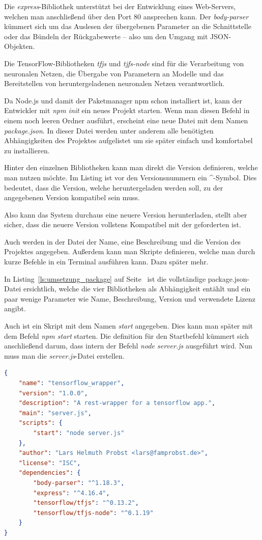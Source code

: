 Die \textit{express}-Bibliothek unterstützt bei der Entwicklung eines Web-Servers, welchen man anschließend über den
Port 80 ansprechen kann. Der \textit{body-parser} kümmert sich um das Auslesen der übergebenen Parameter an die
Schnittstelle oder das Bündeln der Rückgabewerte -- also um den Umgang mit JSON-Objekten.

Die TensorFlow-Bibliotheken \textit{tfjs} und \textit{tjfs-node} sind für die Verarbeitung von neuronalen Netzen,
die Übergabe von Parametern an Modelle und das Bereitstellen von heruntergeladenen neuronalen Netzen verantwortlich.

Da Node.js und damit der Paketmanager npm schon installiert ist, kann der Entwickler mit \textit{npm init} ein neues 
Projekt starten. Wenn man diesen Befehl in einem noch leeren Ordner ausführt, erscheint eine neue Datei mit dem Namen
\textit{package.json}. In dieser Datei werden unter anderem alle benötigten Abhängigkeiten des Projektes aufgelistet 
um sie später einfach und komfortabel zu installieren.

Hinter den einzelnen Bibliotheken kann man direkt die Version definieren, welche man nutzen möchte. Im Listing ist vor
den Versionsnummern ein \textbf{\^}-Symbol. Dies bedeutet, dass die Version, welche heruntergeladen werden soll, zu der
angegebenen Version kompatibel sein muss.

Also kann das System durchaus eine neuere Version herunterladen, stellt aber sicher, dass die neuere Version vollstens
Kompatibel mit der geforderten ist.

Auch werden in der Datei der Name, eine Beschreibung und die Version des Projektes angegeben. Außerdem kann man Skripte
definieren, welche man durch kurze Befehle in ein Terminal ausführen kann. Dazu später mehr.

In Listing~\ref{ls:umsetzung_package} auf Seite~\pageref{ls:umsetzung_package} ist die vollständige package.json-Datei
ersichtlich, welche die vier Bibliotheken als Abhängigkeit entählt und ein paar wenige Parameter wie Name, Beschreibung,
Version und verwendete Lizenz angibt. 

Auch ist ein Skript mit dem Namen \textit{start} angegeben. Dies kann man später mit dem Befehl \textit{npm start}
starten. Die definition für den Startbefehl kümmert sich anschließend darum, dass intern der Befehl
\textit{node server.js} ausgeführt wird. Nun muss man die \textit{server.js}-Datei erstellen.

\begin{lstlisting}[language=JSON, caption=Die komplette package.json, label=ls:umsetzung_package]
{
    "name": "tensorflow_wrapper",
    "version": "1.0.0",
    "description": "A rest-wrapper for a tensorflow app.",
    "main": "server.js",
    "scripts": {
        "start": "node server.js"
    },
    "author": "Lars Helmuth Probst <lars@famprobst.de>",
    "license": "ISC",
    "dependencies": {
        "body-parser": "^1.18.3",
        "express": "^4.16.4",
        "tensorflow/tfjs": "^0.13.2",
        "tensorflow/tfjs-node": "^0.1.19"
    }
}
\end{lstlisting}

